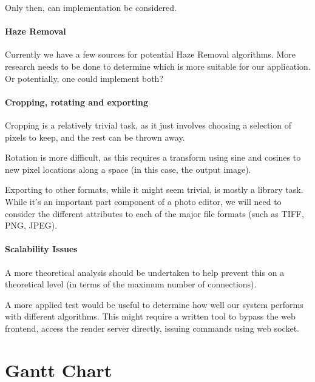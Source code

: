\documentclass[14pt]{article}
\begin{document}
    Only then, can implementation be considered.

  \paragraph{Haze Removal}
    Currently we have a few sources for potential Haze Removal algorithms. More research needs to be done
    to determine which is more suitable for our application. Or potentially, one could implement both?

  \paragraph{Cropping, rotating and exporting}
    Cropping is a relatively trivial task, as it just involves choosing a selection of pixels to keep,
    and the rest can be thrown away.

    Rotation is more difficult, as this requires a transform using sine and cosines to new pixel locations
    along a space (in this case, the output image).

    Exporting to other formats, while it might seem trivial, is mostly a library task. While it's an important part component
    of a photo editor, we will need to consider the different attributes to each of the major file formats (such as TIFF, PNG, JPEG).

  \paragraph{Scalability Issues}
    A more theoretical analysis should be undertaken to help prevent this on a theoretical level (in terms of the maximum number of connections).

    A more applied test would be useful to determine how well our system performs with different algorithms. This might require a written tool to
    bypass the web frontend, access the render server directly, issuing commands using web socket.
\section{Gantt Chart}
\end{document}
